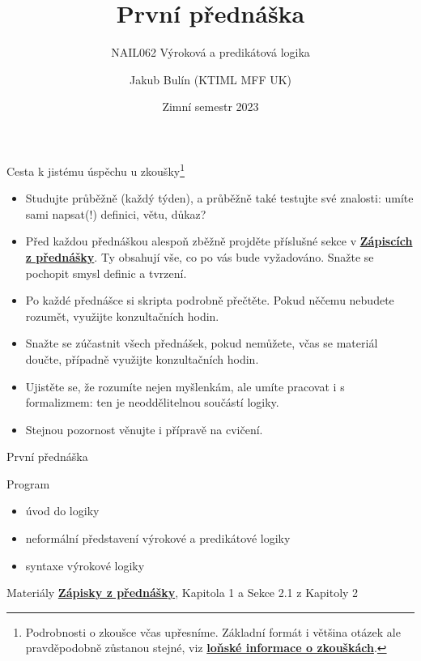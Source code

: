 \documentclass{beamer}
\title{První přednáška}
\subtitle{NAIL062 Výroková a predikátová logika}
\author{Jakub Bulín (KTIML MFF UK)}
\date{Zimní semestr 2023}
\begin{document}
\frame{\titlepage}


\begin{frame}{Cesta k jistému úspěchu u zkoušky\footnote{Podrobnosti o zkoušce včas upřesníme. Základní formát i většina otázek ale pravděpodobně zůstanou stejné, viz \href{https://jbulin.github.io/teaching/fall/nail062/files/info-o-zkouskach.pdf}{\alert{\textbf{loňské informace o zkouškách}}}.}}

\begin{itemize}    
    \item Studujte \alert{průběžně (každý týden)}, a průběžně také \alert{testujte své znalosti}: umíte sami \alert{napsat}(!) definici, větu, důkaz?
    \item Před každou přednáškou alespoň zběžně projděte příslušné sekce v \href{https://github.com/jbulin-mff-uk/nail062/raw/main/lecture/lecture-notes/lecture-notes.pdf}{\alert{\textbf{Zápiscích z přednášky}}}. Ty obsahují vše, co po vás bude vyžadováno. Snažte se pochopit smysl definic a tvrzení.
    \item Po každé přednášce si skripta \alert{podrobně přečtěte}. Pokud něčemu nebudete rozumět, využijte konzultačních hodin.
    \item Snažte se zúčastnit všech přednášek, pokud nemůžete, včas se materiál doučte, případně využijte konzultačních hodin.
    \item Ujistěte se, že rozumíte nejen myšlenkám, ale umíte pracovat i s \alert{formalizmem}: ten je neoddělitelnou součástí logiky.
    \item Stejnou pozornost věnujte i přípravě na \alert{cvičení}.
    \bigskip
\end{itemize}

\end{frame}


\begin{frame}{První přednáška}

    \begin{block}{Program}
        \begin{itemize}
            \item úvod do logiky
            \item neformální představení výrokové a predikátové logiky
            \item syntaxe výrokové logiky
        \end{itemize}        
    \end{block}

    \begin{block}{Materiály}
        \href{https://github.com/jbulin-mff-uk/nail062/raw/main/lecture/lecture-notes/lecture-notes.pdf}{\alert{\textbf{Zápisky z přednášky}}}, Kapitola 1 a Sekce 2.1 z Kapitoly 2
    \end{block}

\end{frame}
\end{document}
